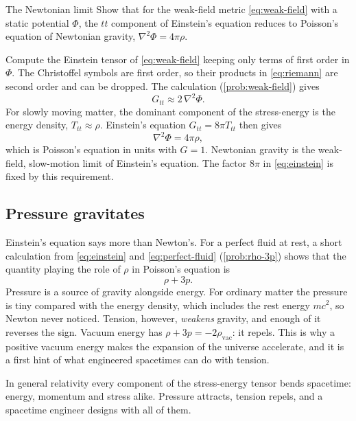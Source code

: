 \begin{example}{The Newtonian limit}\label{ex:newtonian}
Show that for the weak-field metric \cref{eq:weak-field} with a static potential
$\Phi$, the $tt$ component of Einstein's equation reduces to Poisson's equation
of Newtonian gravity, $\nabla^{2}\Phi = 4\pi\rho$.

\solution Compute the Einstein tensor of \cref{eq:weak-field} keeping only
terms of first order in $\Phi$. The Christoffel symbols are first order, so
their products in \cref{eq:riemann} are second order and can be dropped. The
calculation (\cref{prob:weak-field}) gives
\begin{equation*}
  G_{tt} \approx 2\,\nabla^{2}\Phi .
\end{equation*}
For slowly moving matter, the dominant component of the stress-energy is the
energy density, $T_{tt} \approx \rho$. Einstein's equation $G_{tt} = 8\pi T_{tt}$
then gives
\begin{equation*}
  \nabla^{2}\Phi = 4\pi\rho ,
\end{equation*}
which is Poisson's equation in units with $G = 1$.
\discussion Newtonian gravity is the weak-field, slow-motion limit of
Einstein's equation. The factor $8\pi$ in \cref{eq:einstein} is fixed by this
requirement.
\end{example}

\subsection{Pressure gravitates}

Einstein's equation says more than Newton's. For a perfect fluid at rest, a
short calculation from \cref{eq:einstein} and \cref{eq:perfect-fluid}
(\cref{prob:rho-3p}) shows that the quantity playing the role of $\rho$ in
Poisson's equation is
\begin{equation}
  \rho + 3p .
  \label{eq:active-mass}
\end{equation}
Pressure is a source of gravity alongside energy. For ordinary matter the
pressure is tiny compared with the energy density, which includes the rest
energy $mc^{2}$, so Newton never noticed. Tension, however, \emph{weakens}
gravity, and enough of it reverses the sign. Vacuum energy has
$\rho + 3p = -2\rho_{\text{vac}}$: it repels. This is why a positive vacuum
energy makes the expansion of the universe accelerate, and it is a first hint
of what engineered spacetimes can do with tension.

\begin{keyidea}
In general relativity every component of the stress-energy tensor bends
spacetime: energy, momentum and stress alike. Pressure attracts, tension
repels, and a spacetime engineer designs with all of them.
\end{keyidea}

